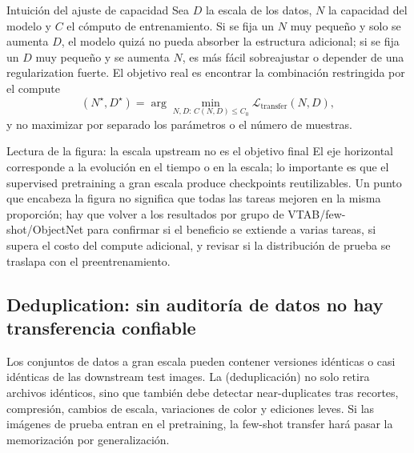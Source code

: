 \begin{importantbox}{Intuición del ajuste de capacidad}
Sea $D$ la escala de los datos, $N$ la capacidad del modelo y $C$ el cómputo de entrenamiento. Si se fija un $N$ muy pequeño y solo se aumenta $D$, el modelo quizá no pueda absorber la estructura adicional; si se fija un $D$ muy pequeño y se aumenta $N$, es más fácil sobreajustar o depender de una regularization fuerte. El objetivo real es encontrar la combinación restringida por el compute
\[
(N^{\star},D^{\star})=\arg\min_{N,D:\,C(N,D)\le C_0}\mathcal{L}_{\text{transfer}}(N,D),
\]
y no maximizar por separado los parámetros o el número de muestras.
\end{importantbox}


\begin{knowledgebox}{Lectura de la figura: la escala upstream no es el objetivo final}
El eje horizontal corresponde a la evolución en el tiempo o en la escala; lo importante es que el supervised pretraining a gran escala produce checkpoints reutilizables. Un punto que encabeza la figura no significa que todas las tareas mejoren en la misma proporción; hay que volver a los resultados por grupo de VTAB/few-shot/ObjectNet para confirmar si el beneficio se extiende a varias tareas, si supera el costo del compute adicional, y revisar si la distribución de prueba se traslapa con el preentrenamiento.
\end{knowledgebox}


\subsection{Deduplication: sin auditoría de datos no hay transferencia confiable}

Los conjuntos de datos a gran escala pueden contener versiones idénticas o casi idénticas de las downstream test images. La  (deduplicación) no solo retira archivos idénticos, sino que también debe detectar near-duplicates tras recortes, compresión, cambios de escala, variaciones de color y ediciones leves. Si las imágenes de prueba entran en el pretraining, la few-shot transfer hará pasar la memorización por generalización.

